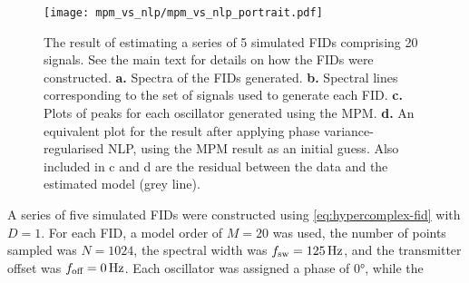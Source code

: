 \begin{figure}
    \centering
    \texttt{[image: mpm\_vs\_nlp/mpm\_vs\_nlp\_portrait.pdf]}
    \caption[
        The result of estimating a series of 5 simulated \acsp{FID}
        using both the \acs{MPM} in isolation, and also with phase
        variance-regularised \acs{NLP} used afterwards.
    ]{
        The result of estimating a series of 5 simulated \acp{FID} comprising
        20 signals. See the main text for details on how the \acp{FID} were
        constructed.
        \textbf{a.} Spectra of the \acp{FID} generated.
        \textbf{b.} Spectral lines corresponding to the set of signals
        used to generate each \ac{FID}.
        \textbf{c.} Plots of peaks for each oscillator generated using
        the \acs{MPM}.
        \textbf{d.} An equivalent plot for the result after applying phase
        variance-regularised \acs{NLP}, using the \acs{MPM} result as an
        initial guess.  Also included in c and d are the
        residual between the data and the estimated model (grey
        line).
    }
    \label{fig:mpm_vs_nlp}
\end{figure}
A series of five simulated \acp{FID} were constructed using
\cref{eq:hypercomplex-fid} with $D=1$. For each \ac{FID}, a model order
of $M=20$ was used, the number of points sampled was $N = 1024$, the spectral
width was $f_{\mathrm{sw}}=\qty{125}{\hertz}$, and the transmitter offset was $f_{\text{off}}
= \qty{0}{\hertz}$.  Each oscillator was assigned a phase of \ang{0}, while the
